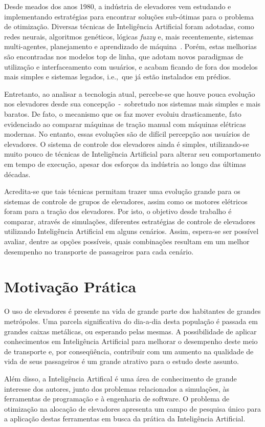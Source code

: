 Desde meados dos anos 1980, a indústria de elevadores vem estudando e implementando estratégias para encontrar soluções sub-ótimas para o problema de otimização. Diversas técnicas de Inteligência Artificial foram adotadas, como redes neurais, algoritmos genéticos, lógicas \textit{fuzzy} e, mais recentemente, sistemas multi-agentes, planejamento e aprendizado de máquina~\cite{KOEHLEROTTIGER02}. Porém, estas melhorias são encontradas nos modelos top de linha, que adotam novos paradigmas de utilização e interfaceamento com usuários, e acabam ficando de fora dos modelos mais simples e sistemas legados, i.e.,~que já estão instalados em prédios.

Entretanto, ao analisar a tecnologia atual, percebe-se que houve pouca evolução nos elevadores desde sua concepção~-~sobretudo nos sistemas mais simples e mais baratos. De fato, o mecanismo que os faz mover evoluiu drasticamente, fato evidenciado ao comparar máquinas de tração manual com máquinas elétricas modernas. No entanto, essas evoluções são de difícil percepção aos usuários de elevadores. O sistema de controle dos elevadores ainda é simples, utilizando-se muito pouco de técnicas de Inteligência Artificial para alterar seu comportamento em tempo de execução, apesar dos esforços da indústria ao longo das últimas décadas.

Acredita-se que tais técnicas permitam trazer uma evolução grande para os sistemas de controle de grupos de elevadores, assim como os motores elétricos foram para a tração dos elevadores. Por isto, o objetivo desde trabalho é comparar, através de simulações, diferentes estratégias de controle de elevadores utilizando Inteligência Artificial em alguns cenários. Assim, espera-se ser possível avaliar, dentre as opções possíveis, quais combinações resultam em um melhor desempenho no transporte de passageiros para cada cenário.

\section{Motivação Prática}

O uso de elevadores é presente na vida de grande parte dos habitantes de grandes metrópoles. Uma parcela significativa do dia-a-dia desta população é passada em grandes caixas metálicas, ou esperando pelas mesmas. A possibilidade de aplicar conhecimentos em Inteligência Artificial para melhorar o desempenho deste meio de transporte e, por conseqüência, contribuir com um aumento na qualidade de vida de seus passageiros é um grande atrativo para o estudo deste assunto.

Além disso, a Inteligência Artifical é uma área de conhecimento de grande interesse dos autores, junto dos problemas relacionados a simulações, às ferramentas de programação e à engenharia de software. O problema de otimização na alocação de elevadores apresenta um campo de pesquisa único para a aplicação destas ferramentas em busca da prática da Inteligência Artificial.